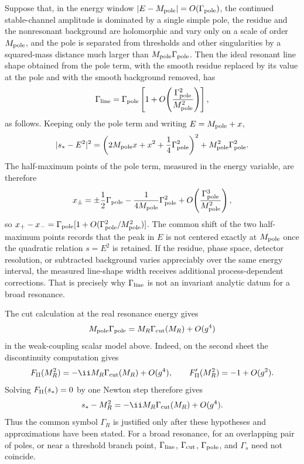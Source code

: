 \begin{controlledapproximation}
Suppose that, in the energy window
\(|E-M_{\rm pole}|=O(\Gamma_{\rm pole})\), the continued stable-channel
amplitude is dominated by a single simple pole, the residue and the
nonresonant background are holomorphic and vary only on a scale of order
\(M_{\rm pole}\), and the pole is separated from thresholds and other
singularities by a squared-mass distance much larger than
\(M_{\rm pole}\Gamma_{\rm pole}\).  Then the ideal resonant line shape
obtained from the pole term, with the smooth residue replaced by its value at
the pole and with the smooth background removed, has
\[
  \Gamma_{\rm line}
  =
  \Gamma_{\rm pole}
  \left[
    1+O\!\left(\frac{\Gamma_{\rm pole}^2}{M_{\rm pole}^2}\right)
  \right],
\]
as follows.  Keeping only the pole term and writing
\(E=M_{\rm pole}+x\),
\[
  |s_\ast-E^2|^2
  =
  \left(
    2M_{\rm pole}x+x^2+\frac14\Gamma_{\rm pole}^2
  \right)^2
  +
  M_{\rm pole}^2\Gamma_{\rm pole}^2 .
\]
The half-maximum points of the pole term, measured in the energy variable, are
therefore
\[
  x_\pm
  =
  \pm\frac12\Gamma_{\rm pole}
  -\frac{1}{4M_{\rm pole}}\Gamma_{\rm pole}^2
  +O\!\left(\frac{\Gamma_{\rm pole}^3}{M_{\rm pole}^2}\right),
\]
so \(x_+-x_-=\Gamma_{\rm pole}[1+O(\Gamma_{\rm pole}^2/M_{\rm pole}^2)]\).
The common shift of the two half-maximum points records that the peak in
\(E\) is not centered exactly at \(M_{\rm pole}\) once the quadratic relation
\(s=E^2\) is retained.  If the residue, phase space, detector resolution, or
subtracted background varies appreciably over the same energy interval, the
measured line-shape width receives additional process-dependent corrections.
That is precisely why \(\Gamma_{\rm line}\) is not an invariant analytic datum
for a broad resonance.

The cut calculation at the real resonance energy gives
\[
  M_{\rm pole}\Gamma_{\rm pole}
  =
  M_R\Gamma_{\rm cut}(M_R)
  +O(g^4)
\]
in the weak-coupling scalar model above.  Indeed, on the second sheet the
discontinuity computation gives
\[
  F_{\rm II}(M_R^2)
  =
  -\ii M_R\Gamma_{\rm cut}(M_R)+O(g^4),
  \qquad
  F_{\rm II}'(M_R^2)=-1+O(g^2).
\]
Solving \(F_{\rm II}(s_\ast)=0\) by one Newton step therefore gives
\[
  s_\ast-M_R^2
  =
  -\ii M_R\Gamma_{\rm cut}(M_R)+O(g^4).
\]
Thus the common symbol \(\Gamma_R\) is justified only after these hypotheses
and approximations have been stated.  For a broad resonance, for an
overlapping pair of poles, or near a threshold branch point,
\(\Gamma_{\rm line}\), \(\Gamma_{\rm cut}\), \(\Gamma_{\rm pole}\), and
\(\Gamma_s\) need not coincide.
\end{controlledapproximation}

